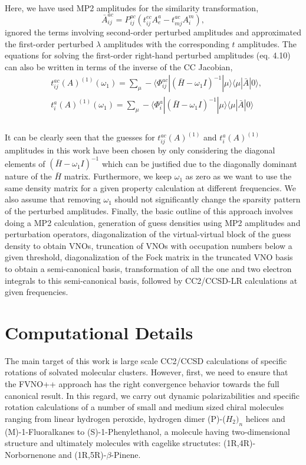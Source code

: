 \\
Here, we have used MP2 amplitudes for the similarity transformation,
\begin{equation}
\bar{A}^{ac}_{ij} = P_{ij}^{ac}(t^{ec}_{ij}A^a_e - t^{ac}_{mj}A^m_i) ,
\end{equation}
ignored the terms involving second-order perturbed amplitudes and 
approximated the first-order perturbed $\lambda$ amplitudes with the 
corresponding $t$ amplitudes. The equations for solving the first-order 
right-hand perturbed amplitudes (eq. 4.10) can also be written in terms
of the inverse of the CC Jacobian,
\\
\begin{equation}
\begin{split}
& t^{ac}_{ij}(A)^{(1)}(\omega_1) = \sum_\mu - \langle\Phi_{ij}^{ac}| {(\bar{H} -\omega_1 I)}^{-1} |
\mu\rangle\langle \mu| \bar{A} | 0\rangle, \\
& t^{a}_{i}(A)^{(1)}(\omega_1) = \sum_\mu -\langle\Phi_{i}^{a}| {(\bar{H} -\omega_1 I)}^{-1} |
\mu\rangle \langle \mu| \bar{A} | 0\rangle \\
\end{split}
\end{equation}
\\
It can be clearly seen that the guesses for $t^{ac}_{ij}(A)^{(1)}$ and 
$t^{a}_{i}(A)^{(1)}$ amplitudes in this work have been chosen by 
only considering the diagonal elements of $(\bar{H} -\omega_1 I)^{-1}$
which can be justified due to the diagonally dominant nature of the
$\bar{H}$ matrix. Furthermore, we keep $\omega_1$ as zero as we 
want to use the same density matrix for a given property calculation at different
frequencies. We also assume that removing $\omega_1$ should not significantly change the 
sparsity pattern of the perturbed amplitudes. Finally, the basic outline of this approach
involves doing a MP2 calculation, generation of guess densities using MP2 amplitudes and 
perturbation operators, diagonalization of the virtual-virtual block of the guess density 
to obtain VNOs, truncation of VNOs with occupation numbers below a given threshold, 
diagonalization of the Fock matrix in the truncated VNO basis to obtain a semi-canonical 
basis, transformation of all the one and two electron integrals to this semi-canonical 
basis, followed by CC2\cite{Christiansen95:CC2}/CCSD-LR calculations at given frequencies.
\section{Computational Details}
The main target of this work is large scale CC2/CCSD calculations of specific 
rotations of solvated molecular clusters. However, first, we need to ensure 
that the FVNO++ approach has the right convergence behavior towards the full
canonical result. In this regard, we carry out dynamic polarizabilities 
and specific rotation calculations of a number of small and medium sized 
chiral molecules ranging from linear hydrogen peroxide, hydrogen dimer (P)-($H_2)_n$ 
helices and (M)-1-Fluoralkanes to (S)-1-Phenylethanol, a molecule having two-dimensional 
structure and ultimately molecules with cagelike structutes: (1R,4R)-Norbornenone
and (1R,5R)-$\beta$-Pinene. 
